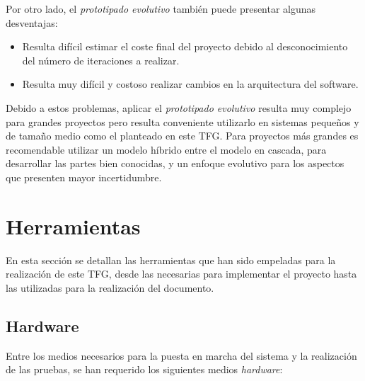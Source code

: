 Por otro lado, el \emph{prototipado evolutivo} también puede presentar algunas desventajas:

\begin{itemize}
  \item Resulta difícil estimar el coste final del proyecto debido al desconocimiento del número de
    iteraciones a realizar.
  \item Resulta muy difícil y costoso realizar cambios en la arquitectura del software.
\end{itemize}

Debido a estos problemas, aplicar el \emph{prototipado evolutivo} resulta muy complejo para grandes
proyectos pero resulta conveniente utilizarlo en sistemas pequeños y de tamaño medio como el
planteado en este \acs{TFG}. Para proyectos más grandes es recomendable utilizar un modelo híbrido
entre el modelo en cascada, para desarrollar las partes bien conocidas, y un enfoque evolutivo para
los aspectos que presenten mayor incertidumbre.

\section{Herramientas}

En esta sección se detallan las herramientas que han sido empeladas para la realización de este
\acs{TFG}, desde las necesarias para implementar el proyecto hasta las utilizadas para la
realización del documento.

\subsection{Hardware}
\label{sec:herramientasHardware}

Entre los medios necesarios para la puesta en marcha del sistema y la realización de las pruebas, se
han requerido los siguientes medios \emph{hardware}:

